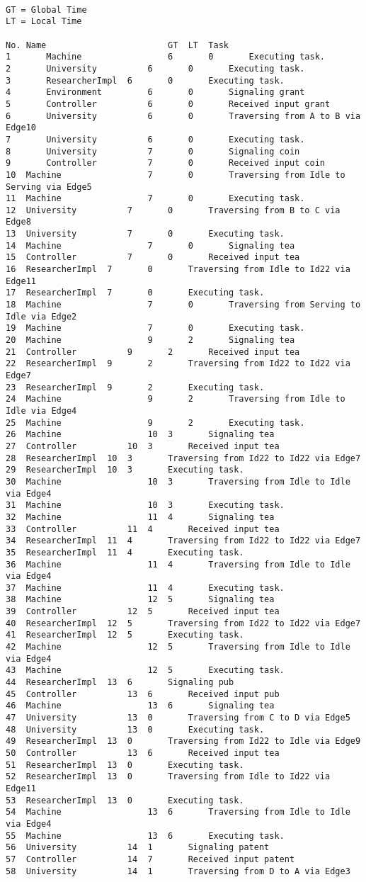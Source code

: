 \begin{lstlisting}

GT = Global Time
LT = Local Time

No.	Name						GT	LT	Task
1		Machine					6		0		Executing task.
2		University			6		0		Executing task.
3		ResearcherImpl	6		0		Executing task.
4		Environment			6		0		Signaling grant
5		Controller			6		0		Received input grant
6		University			6		0		Traversing from A to B via Edge10
7		University			6		0		Executing task.
8		University			7		0		Signaling coin
9		Controller			7		0		Received input coin
10	Machine					7		0		Traversing from Idle to Serving via Edge5
11	Machine					7		0		Executing task.
12	University			7		0		Traversing from B to C via Edge8
13	University			7		0		Executing task.
14	Machine					7		0		Signaling tea
15	Controller			7		0		Received input tea
16	ResearcherImpl	7		0		Traversing from Idle to Id22 via Edge11
17	ResearcherImpl	7		0		Executing task.
18	Machine					7		0		Traversing from Serving to Idle via Edge2
19	Machine					7		0		Executing task.
20	Machine					9		2		Signaling tea
21	Controller			9		2		Received input tea
22	ResearcherImpl	9		2		Traversing from Id22 to Id22 via Edge7
23	ResearcherImpl	9		2		Executing task.
24	Machine					9		2		Traversing from Idle to Idle via Edge4
25	Machine					9		2		Executing task.
26	Machine					10	3		Signaling tea
27	Controller			10	3		Received input tea
28	ResearcherImpl	10	3		Traversing from Id22 to Id22 via Edge7
29	ResearcherImpl	10	3		Executing task.
30	Machine					10	3		Traversing from Idle to Idle via Edge4
31	Machine					10	3		Executing task.
32	Machine					11	4		Signaling tea
33	Controller			11	4		Received input tea
34	ResearcherImpl	11	4		Traversing from Id22 to Id22 via Edge7
35	ResearcherImpl	11	4		Executing task.
36	Machine					11	4		Traversing from Idle to Idle via Edge4
37	Machine					11	4		Executing task.
38	Machine					12	5		Signaling tea
39	Controller			12	5		Received input tea
40	ResearcherImpl	12	5		Traversing from Id22 to Id22 via Edge7
41	ResearcherImpl	12	5		Executing task.
42	Machine					12	5		Traversing from Idle to Idle via Edge4
43	Machine					12	5		Executing task.
44	ResearcherImpl	13	6		Signaling pub
45	Controller			13	6		Received input pub
46	Machine					13	6		Signaling tea
47	University			13	0		Traversing from C to D via Edge5
48	University			13	0		Executing task.
49	ResearcherImpl	13	0		Traversing from Id22 to Idle via Edge9
50	Controller			13	6		Received input tea
51	ResearcherImpl	13	0		Executing task.
52	ResearcherImpl	13	0		Traversing from Idle to Id22 via Edge11
53	ResearcherImpl	13	0		Executing task.
54	Machine					13	6		Traversing from Idle to Idle via Edge4
55	Machine					13	6		Executing task.
56	University			14	1		Signaling patent
57	Controller			14	7		Received input patent
58	University			14	1		Traversing from D to A via Edge3
\end{lstlisting}